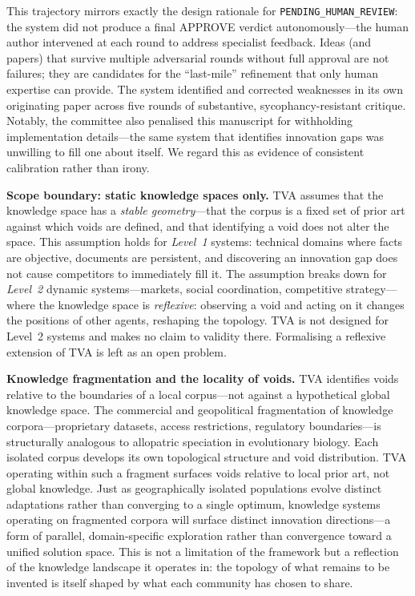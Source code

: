 \documentclass[11pt,twocolumn]{article}
\begin{document}
This trajectory mirrors exactly the design rationale for
\texttt{PENDING\_HUMAN\_REVIEW}: the system did not produce a final
APPROVE verdict autonomously---the human author intervened at each
round to address specialist feedback.  Ideas (and papers) that
survive multiple adversarial rounds without full approval are not
failures; they are candidates for the ``last-mile'' refinement that
only human expertise can provide.  The system identified and corrected
weaknesses in its own originating paper across five rounds of
substantive, sycophancy-resistant critique.
Notably, the committee also penalised this manuscript for withholding
implementation details---the same system that identifies innovation
gaps was unwilling to fill one about itself.  We regard this as
evidence of consistent calibration rather than irony.

\textbf{Scope boundary: static knowledge spaces only.}
TVA assumes that the knowledge space has a \emph{stable geometry}---that
the corpus is a fixed set of prior art against which voids are defined,
and that identifying a void does not alter the space.
This assumption holds for \emph{Level~1} systems: technical domains
where facts are objective, documents are persistent, and discovering
an innovation gap does not cause competitors to immediately fill it.
The assumption breaks down for \emph{Level~2} dynamic systems---markets,
social coordination, competitive strategy---where the knowledge space
is \emph{reflexive}: observing a void and acting on it changes the
positions of other agents, reshaping the topology.
TVA is not designed for Level~2 systems and makes no claim to validity
there.  Formalising a reflexive extension of TVA is left as an open problem.

\textbf{Knowledge fragmentation and the locality of voids.}
TVA identifies voids relative to the boundaries of a local corpus---not
against a hypothetical global knowledge space.  The commercial and
geopolitical fragmentation of knowledge corpora---proprietary datasets,
access restrictions, regulatory boundaries---is structurally analogous
to allopatric speciation in evolutionary biology.  Each isolated corpus
develops its own topological structure and void distribution.  TVA
operating within such a fragment surfaces voids relative to local prior
art, not global knowledge.  Just as geographically isolated populations
evolve distinct adaptations rather than converging to a single optimum,
knowledge systems operating on fragmented corpora will surface distinct
innovation directions---a form of parallel, domain-specific exploration
rather than convergence toward a unified solution space.  This is not a
limitation of the framework but a reflection of the knowledge landscape
it operates in: the topology of what remains to be invented is itself
shaped by what each community has chosen to share.
\end{document}
